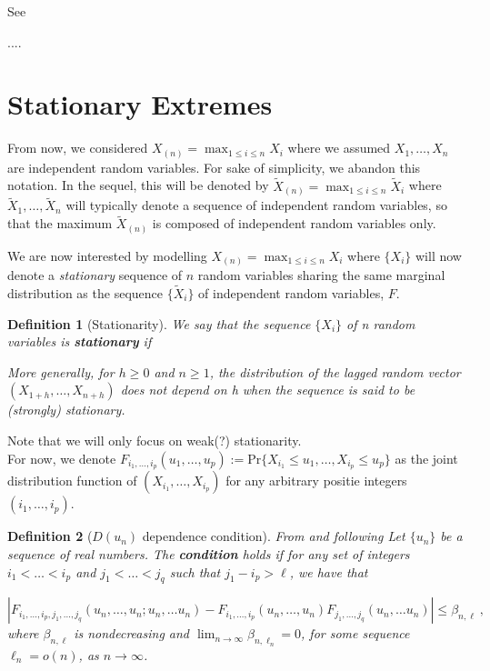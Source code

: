 \documentclass[11pt,a4paper,openany ]{book}
\newtheorem{definition}{Definition}[chapter]
\begin{document}
See \cite[pp.375]{beirlant_statistics_2006}

....

\section{Stationary Extremes}\label{statio}

From now, we considered $X_{(n)}=\max_{1\leq i\leq n}X_i$  where we assumed 
$X_1,\dots,X_n$  are independent random variables. For sake of simplicity, we abandon this 
notation. In the sequel, this will be denoted by $\tilde{X}_{(n)}=\max_{1\leq i\leq 
n}\tilde{X}_i$ where $\tilde{X}_1,\dots,\tilde{X}_n$ will typically denote a sequence of 
independent random variables, so that the maximum $\tilde{X}_{(n)}$ is composed of independent random variables only.

 We are now interested by modelling 
$X_{(n)}=\max_{1\leq i\leq n}X_i$ where $\{X_i\}$ will now denote a \emph{stationary} 
sequence of $n$ random variables sharing the same marginal distribution as the sequence $\{\tilde{X}_i\}$ of independent random variables, 
$F$.

\begin{definition}[Stationarity] We say that the sequence $\{X_i\}$ of n random variables is \emph{\textbf{stationary}} if 
	
	More generally, for $h\geq 0$ and $n\geq 1$, the distribution of the lagged random vector $(X_{1+h},\dots,X_{n+h})$ does not depend on h when the sequence is said to be (strongly) stationary.
\end{definition}
Note that we will only focus on weak(?) stationarity. \\



For now, we denote $F_{i_1,\dots,i_p}(u_1,\dots,u_p):=\text{Pr}\{X_{i_1}\leq 
u_1,\dots,X_{i_p}\leq u_p\}$ as the joint distribution function of 
$(X_{i_1},\dots,X_{i_p})$ for any arbitrary positie integers $(i_1,\dots,i_p)$.

\begin{definition}[$D(u_n)$ dependence condition] From \cite{leadbetter_extreme_1974}  and following \cite[pp.373-374, pp.93]{beirlant_statistics_2006,coles_introduction_2001}
	Let $\{u_n\}$ be a sequence of real numbers. The \emph{  \textbf{condition}} holds if for any set of integers $i_1<\dots<i_p$ and $j_1<\dots<j_q$ such that $j_1-i_p>\ell$, we have that 
	
	\begin{equation}
	|F_{i_1,\dots,i_p,j_1,\dots,j_q}(u_n,\dots,u_n;u_n,\dots u_n)-F_{i_1,\dots,i_p}(u_n,\dots,u_n)F_{j_1,\dots,j_q}(u_n,\dots u_n)|\leq \beta_{n,\ell}\ ,
	\end{equation}
	where $\beta_{n,\ell}$ is nondecreasing and  $\displaystyle{\lim_{n \to \infty}}\beta_{n,\ell_n}=0$, for some sequence $\ell_n=o(n)$, as $n\rightarrow\infty$.
\end{definition}
\end{document}
